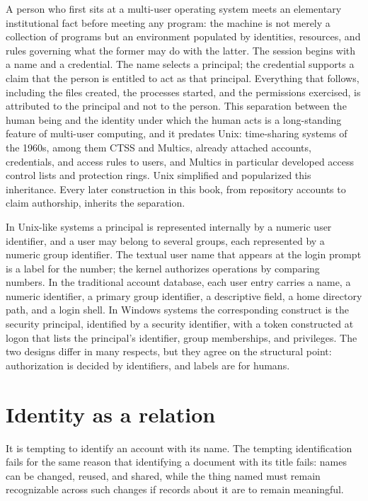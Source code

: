 \documentclass[11pt,twoside,openright]{book}
\theoremstyle{plain}
\theoremstyle{definition}
\theoremstyle{remark}
\begin{document}
A person who first sits at a multi-user operating system meets an elementary institutional fact before meeting any program: the machine is not merely a collection of programs but an environment populated by identities, resources, and rules governing what the former may do with the latter. The session begins with a name and a credential. The name selects a principal; the credential supports a claim that the person is entitled to act as that principal. Everything that follows, including the files created, the processes started, and the permissions exercised, is attributed to the principal and not to the person. This separation between the human being and the identity under which the human acts is a long-standing feature of multi-user computing, and it predates Unix: time-sharing systems of the 1960s, among them CTSS and Multics, already attached accounts, credentials, and access rules to users, and Multics in particular developed access control lists and protection rings. Unix simplified and popularized this inheritance. Every later construction in this book, from repository accounts to claim authorship, inherits the separation.

In Unix-like systems a principal is represented internally by a numeric user identifier, and a user may belong to several groups, each represented by a numeric group identifier. The textual user name that appears at the login prompt is a label for the number; the kernel authorizes operations by comparing numbers. In the traditional account database, each user entry carries a name, a numeric identifier, a primary group identifier, a descriptive field, a home directory path, and a login shell. In Windows systems the corresponding construct is the security principal, identified by a security identifier, with a token constructed at logon that lists the principal's identifier, group memberships, and privileges. The two designs differ in many respects, but they agree on the structural point: authorization is decided by identifiers, and labels are for humans.

\section{Identity as a relation}

It is tempting to identify an account with its name. The tempting identification fails for the same reason that identifying a document with its title fails: names can be changed, reused, and shared, while the thing named must remain recognizable across such changes if records about it are to remain meaningful.
\end{document}
